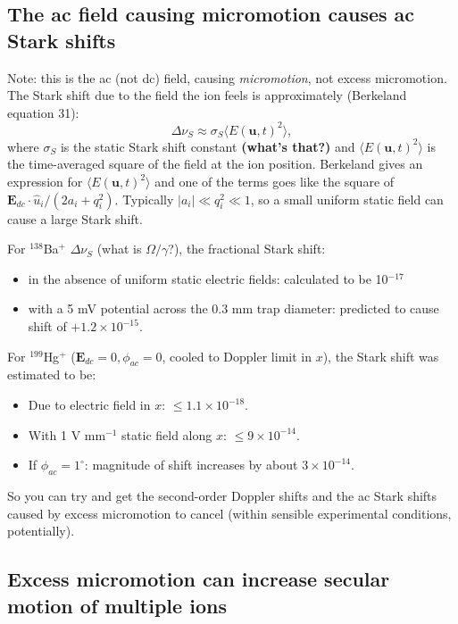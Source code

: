 \documentclass{article}
\begin{document}
\subsection*{The ac field causing micromotion causes ac Stark shifts}

Note: this is the ac (not dc) field, causing \textit{micromotion}, not excess micromotion. The Stark shift due to the field the ion feels is approximately (Berkeland equation 31):
%
\begin{equation}
\Delta \nu_S \approx \sigma_S \langle E(\mathbf{u}, t)^2 \rangle, 
\end{equation}
%
where $\sigma_S$ is the static Stark shift constant \textbf{(what's that?)} and $\langle E(\mathbf{u}, t)^2 \rangle$ is the time-averaged square of the field at the ion position. Berkeland gives an expression for $\langle E(\mathbf{u}, t)^2 \rangle$ and one of the terms goes like the square of $\mathbf{E}_{dc} \cdot \hat{u}_i / (2a_i + q^2_i)$. Typically $|a_i| \ll q^2_i \ll 1$, so a small uniform static field can cause a large Stark shift.

For $^{138}$Ba$^+$ $\Delta \nu_S$ (what is $\Omega/\gamma$?), the fractional Stark shift:

\begin{itemize}
\item in the absence of uniform static electric fields: calculated to be 10$^{-17}$
\item with a 5 mV potential across the 0.3 mm trap diameter: predicted to cause shift of $+ 1.2 \times 10^{-15}$.
\end{itemize} 

For $^{199}$Hg$^+$ ($\mathbf{E}_{dc} = 0, \phi_{ac} = 0$, cooled to Doppler limit in $x$), the Stark shift was estimated to be:

\begin{itemize}
\item Due to electric field in $x$: $\leq 1.1 \times 10^{-18}$.
\item With 1 V mm$^{-1}$ static field along $x$: $\leq 9 \times 10^{-14}$.
\item If $\phi_{ac} = 1^{\circ}$: magnitude of shift increases by about $3 \times 10^{-14}$.
\end{itemize}

So you can try and get the second-order Doppler shifts and the ac Stark shifts caused by excess micromotion to cancel (within sensible experimental conditions, potentially).


\subsection*{Excess micromotion can increase secular motion of multiple ions}
\end{document}
